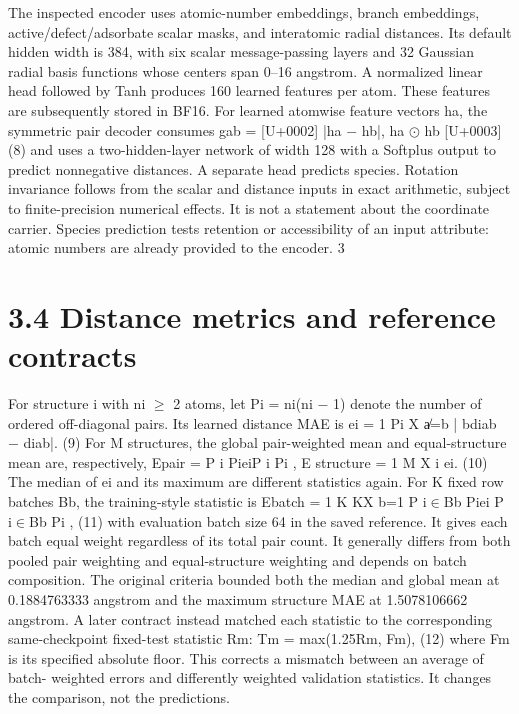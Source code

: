 \documentclass[11pt]{article}
\begin{document}
The inspected encoder uses atomic-number embeddings, branch embeddings, active/defect/adsorbate
scalar masks, and interatomic radial distances. Its default hidden width is 384, with six scalar
message-passing layers and 32 Gaussian radial basis functions whose centers span 0–16 angstrom.
A normalized linear head followed by Tanh produces 160 learned features per atom. These features
are subsequently stored in BF16.
For learned atomwise feature vectors ha, the symmetric pair decoder consumes
gab =
[U+0002]
|ha \ensuremath{-} hb|, ha \ensuremath{\odot} hb
[U+0003]
(8)
and uses a two-hidden-layer network of width 128 with a Softplus output to predict nonnegative
distances. A separate head predicts species. Rotation invariance follows from the scalar and
distance inputs in exact arithmetic, subject to finite-precision numerical effects. It is not a statement
about the coordinate carrier. Species prediction tests retention or accessibility of an input attribute:
atomic numbers are already provided to the encoder.
3


\section*{3.4 Distance metrics and reference contracts}

For structure i with ni \ensuremath{\geq} 2 atoms, let Pi = ni(ni \ensuremath{-} 1) denote the number of ordered off-diagonal
pairs. Its learned distance MAE is
ei = 1
Pi
X
a̸=b
| bdiab \ensuremath{-} diab|. (9)
For M structures, the global pair-weighted mean and equal-structure mean are, respectively,
Epair =
P
i PieiP
i Pi
, E structure = 1
M
X
i
ei. (10)
The median of ei and its maximum are different statistics again. For K fixed row batches Bb, the
training-style statistic is
Ebatch = 1
K
KX
b=1
P
i\ensuremath{\in}Bb Piei
P
i\ensuremath{\in}Bb Pi
, (11)
with evaluation batch size 64 in the saved reference. It gives each batch equal weight regardless
of its total pair count. It generally differs from both pooled pair weighting and equal-structure
weighting and depends on batch composition.
The original criteria bounded both the median and global mean at 0.1884763333 angstrom and
the maximum structure MAE at 1.5078106662 angstrom. A later contract instead matched each
statistic to the corresponding same-checkpoint fixed-test statistic Rm:
Tm = max(1.25Rm, Fm), (12)
where Fm is its specified absolute floor. This corrects a mismatch between an average of batch-
weighted errors and differently weighted validation statistics. It changes the comparison, not the
predictions.
\end{document}

